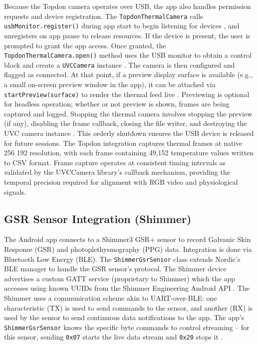 Because the Topdon camera operates over USB, the app also handles permission requests and device registration. The \texttt{TopdonThermalCamera} calls \texttt{usbMonitor.register()} during app start to begin listening for devices \citep{ref16}, and unregisters on app pause to release resources. If the device is present, the user is prompted to grant the app access. Once granted, the \texttt{TopdonThermalCamera.open()} method uses the USB monitor to obtain a control block and create a \texttt{UVCCamera} instance \citep{ref16}. The camera is then configured and flagged as connected. At that point, if a preview display surface is available (e.g., a small on-screen preview window in the app), it can be attached via \texttt{startPreview(surface)} to render the thermal feed live \citep{ref16}. Previewing is optional for headless operation; whether or not preview is shown, frames are being captured and logged. Stopping the thermal camera involves stopping the preview (if any), disabling the frame callback, closing the file writer, and destroying the UVC camera instance \citep{ref16}. This orderly shutdown ensures the USB device is released for future sessions. The Topdon integration captures thermal frames at native 256\,\texttimes\,192 resolution, with each frame containing 49{,}152 temperature values written to CSV format. Frame capture operates at consistent timing intervals as validated by the UVCCamera library's callback mechanism, providing the temporal precision required for alignment with RGB video and physiological signals.

\subsection{GSR Sensor Integration (Shimmer)}\label{sec:4-2-2}
The Android app connects to a Shimmer3 GSR+ sensor to record Galvanic Skin Response (GSR) and photoplethysmography (PPG) data. Integration is done via Bluetooth Low Energy (BLE). The \texttt{ShimmerGsrSensor} class extends Nordic's BLE manager to handle the GSR sensor's protocol. The Shimmer device advertises a custom GATT service (proprietary to Shimmer) which the app accesses using known UUIDs from the Shimmer Engineering Android API \citep{ref15}. The Shimmer uses a communication scheme akin to UART-over-BLE: one characteristic (TX) is used to send commands to the sensor, and another (RX) is used by the sensor to send continuous data notifications to the app. The app's \texttt{ShimmerGsrSensor} knows the specific byte commands to control streaming -- for this sensor, sending \texttt{0x07} starts the live data stream and \texttt{0x20} stops it \citep{ref15}.

